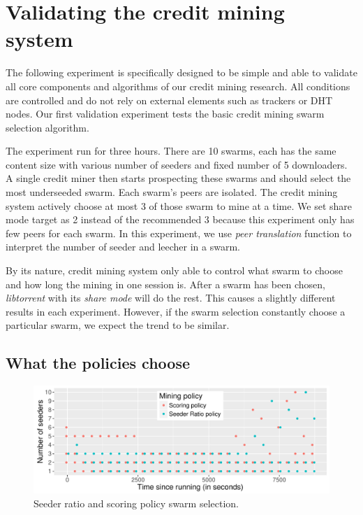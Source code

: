 \section{Validating the credit mining system}
\label{section:chooseswarmexp}
The following experiment is specifically designed to be simple and able to validate all core components and algorithms of our credit mining research. All conditions are controlled and do not rely on external elements such as trackers or DHT nodes. Our first validation experiment tests the basic credit mining swarm selection algorithm.

The experiment run for three hours. There are 10 swarms, each has the same content size with various number of seeders and fixed number of 5 downloaders. A single credit miner then starts prospecting these swarms and should select the most underseeded swarm. Each swarm's peers are isolated. The credit mining system actively choose at most 3 of those swarm to mine at a time. We set share mode target as 2 instead of the recommended 3 because this experiment only has few peers for each swarm. In this experiment, we use \textit{peer translation} function to interpret the number of seeder and leecher in a swarm.

By its nature, credit mining system only able to control what swarm to choose and how long the mining in one session is. After a swarm has been chosen, \textit{libtorrent} with its \textit{share mode} will do the rest. This causes a slightly different results in each experiment. However, if the swarm selection constantly choose a particular swarm, we expect the trend to be similar. 

\subsection{What the policies choose}
\begin{figure}[b]
	\centering
	\includegraphics[width=\textwidth]{pics/results/scsr_notrig_scatter.pdf}
	\caption{Seeder ratio and scoring policy swarm selection.}
	\label{fig:scatterscsrnotrig}
\end{figure}

